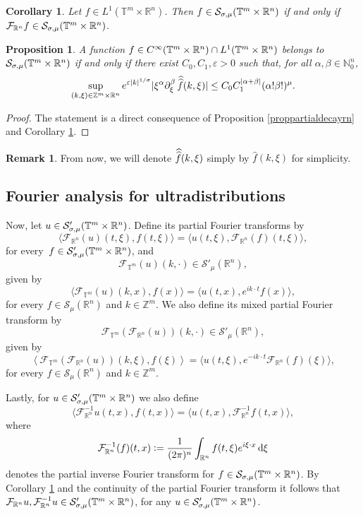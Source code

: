 \documentclass[11pt,reqno]{amsart}
\numberwithin{equation}{section}
\newtheorem{corollary}[theorem]{Corollary}
\newtheorem{prop}[theorem]{Proposition}
\theoremstyle{definition}
\newtheorem{obs}{Remark}
\theoremstyle{definition}
\newcommand{\T}{\mathbb{T}}
\newcommand{\G}{\mathnormal{\mathbb{T}^{m}\times\mathbb{R}^n}}
\newcommand{\R}{\mathbb{R}}
\newcommand{\Z}{\mathbb{Z}}
\newcommand{\N}{\mathbb{N}}
\renewcommand{\S}{\mathcal{S}_{\sigma,\mu}(\G)}
\renewcommand{\SS}{\mathcal{S}'_{\sigma,\mu}(\G)}
\DeclareMathOperator{\ftil}{\widehat{\widehat{\mathnormal{f}\,}}\!\!\,}
\newcommand{\defeq}{\vcentcolon=}
\begin{document}
    \begin{corollary}\label{coro_gelf_transf} 
        Let $f\in L^1(\T^m\times\R^n)$. Then $f\in\S$ if and only if $\mathcal{F}_{\R^n}f\in\S$.
    \end{corollary}

    \begin{prop}\label{proppartialdecaymix}
    A function $f\in C^\infty(\G)\cap L^1(\G)$ belongs to $\S$ if and only if there exist $C_0,C_1,\varepsilon>0$ such that, for all $\alpha,\beta\in\N_0^n$,
    \begin{equation}\label{ineqmix}
    \sup_{(k,\xi)\in\Z^m\times\R^n} e^{\varepsilon|k|^{1/\sigma}}|\xi^\alpha\partial_{\xi}^\beta\ftil(k,\xi)|\leq C_0C_1^{|\alpha+\beta|}(\alpha!\beta!)^\mu .
    \end{equation}
    \end{prop}
    \begin{proof}
    The statement is a direct consequence of Proposition \ref{proppartialdecayrn} and Corollary \ref{coro_gelf_transf}.
    \end{proof}

    \begin{obs}
        From now, we will denote $\ftil(k,\xi)$ simply by $\widehat{f}(k,\xi)$ for simplicity.
    \end{obs}

    \subsection{Fourier analysis for ultradistributions}

    Now, let $u\in \SS$. Define its partial Fourier transforms by
    $$\langle\mathcal{F}_{\R^n}(u)(t,\xi),f(t,\xi)\rangle = \langle u(t,\xi),\mathcal{F}_{\R^n}(f)(t,\xi)\rangle,$$
    for every $ \,f\in\SS$, and
    $$\mathcal{F}_{\T^m}(u)(k,\cdot)\in \mathcal{S}'_\mu(\R^n),$$
    given by 
    $$\langle\mathcal{F}_{\T^m}(u)(k,x),f(x)\rangle = \langle u(t,x),e^{ik\cdot t}f(x)\rangle,$$
    for every $f\in\mathcal{S}_\mu(\R^n)$ and $k\in\Z^m$.
    We also define its mixed partial Fourier transform by
    $$\mathcal{F}_{\T^m}(\mathcal{F}_{\R^n}(u))(k,\cdot)\in \mathcal{S}'_\mu(\R^n),$$
    given by
    $$\left\langle \mathcal{F}_{\T^m}(\mathcal{F}_{\R^n}(u))(k,\xi),f(\xi)\right\rangle = \langle u(t,\xi),e^{-ik\cdot t}\mathcal{F}_{\R^n}(f)(\xi)\rangle,$$
    for every $f\in\mathcal{S}_\mu(\R^n)$ and $k\in\Z^m$.
    
    Lastly, for $u\in\SS$ we also define $$\langle\mathcal{F}_{\R^n}^{-1}u(t,x),f(t,x)\rangle = \langle u(t,x),\mathcal{F}_{\R^n}^{-1}f(t,x)\rangle,$$
    where 
    \begin{equation*}
        \mathcal{F}^{-1}_{\R^n}(f)(t,x)\defeq \frac{1}{(2\pi)^n}\int_{\R^n}f(t,\xi)e^{i\xi\cdot x }\,\mathrm{d}\xi
    \end{equation*}
    denotes the partial inverse Fourier transform for $f\in \S$.
    By Corollary \ref{coro_gelf_transf} and the continuity of the partial Fourier transform it follows that $\mathcal{F}_{\R^n}u,\mathcal{F}_{\R^n}^{-1}u\in\SS$, for any $u\in \SS$.
\end{document}
